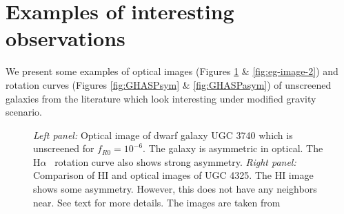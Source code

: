 \documentclass[useAMS,usenatbib,twocolumn]{mn2e}
\newcommand{\ha}{H$\alpha$}
\begin{document}
\section{Examples of interesting observations}
\label{ap:curves}
We present some examples of optical images (Figures \ref{fig:eg-image-1} \&
\ref{fig:eg-image-2}) and rotation curves (Figures \ref{fig:GHASPsym} \&
\ref{fig:GHASPasym}) of unscreened galaxies from the literature which look
interesting under modified gravity scenario. 


\begin{figure}
\caption{{\it Left panel:} Optical image of dwarf galaxy UGC 3740 which is
unscreened for $f_{R0}=10^{-6}$. The galaxy is asymmetric in optical. The \ha~
rotation curve also shows strong asymmetry. 
{\it Right panel:} Comparison of HI and optical images of UGC 4325. The HI
image shows some asymmetry. However, this does not have any neighbors near. See
text for more details. The images are taken from \citet{figgs2008,swaters2002b}
\label{fig:eg-image-1}}
\end{figure}
\end{document}

